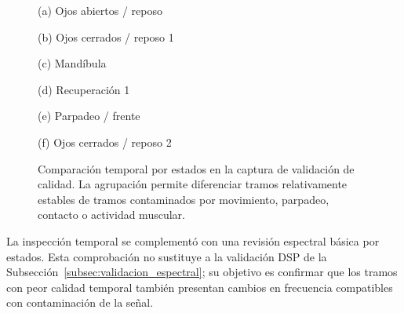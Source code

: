 \begin{figure}[!htbp]
    \centering
    \begin{minipage}{0.48\textwidth}
        \centering
        \small (a) Ojos abiertos / reposo
    \end{minipage}
    \hfill
    \begin{minipage}{0.48\textwidth}
        \centering
        \small (b) Ojos cerrados / reposo 1
    \end{minipage}

    \vspace{0.25cm}

    \begin{minipage}{0.48\textwidth}
        \centering
        \small (c) Mandíbula
    \end{minipage}
    \hfill
    \begin{minipage}{0.48\textwidth}
        \centering
        \small (d) Recuperación 1
    \end{minipage}

    \vspace{0.25cm}

    \begin{minipage}{0.48\textwidth}
        \centering
        \small (e) Parpadeo / frente
    \end{minipage}
    \hfill
    \begin{minipage}{0.48\textwidth}
        \centering
        \small (f) Ojos cerrados / reposo 2
    \end{minipage}
    \caption{Comparación temporal por estados en la captura de validación de calidad. La agrupación permite diferenciar tramos relativamente estables de tramos contaminados por movimiento, parpadeo, contacto o actividad muscular.}
    \label{fig:validacion_estados_temporales_grid}
\end{figure}

La inspección temporal se complementó con una revisión espectral básica por estados. Esta comprobación no sustituye a la validación DSP de la Subsección~\ref{subsec:validacion_espectral}; su objetivo es confirmar que los tramos con peor calidad temporal también presentan cambios en frecuencia compatibles con contaminación de la señal.

